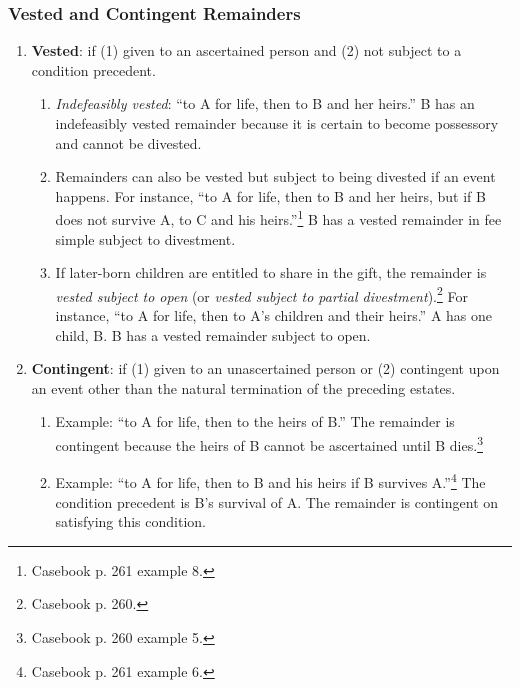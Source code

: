 \subsubsection{Vested and Contingent Remainders}

\begin{enumerate}
    \item \textbf{Vested}: if (1) given to an ascertained person and (2) not 
    subject to a condition precedent.
    \begin{enumerate}
        \item \emph{Indefeasibly vested}:  ``to A for life, then to B and her 
        heirs.'' B has an indefeasibly vested remainder because it is certain 
        to become possessory and cannot be divested.
        \item Remainders can also be vested but subject to being divested if 
        an event happens. For instance, ``to A for life, then to B and her 
        heirs, but if B does not survive A, to C and his 
        heirs.''\footnote{Casebook p. 261 example 8.} B has a vested remainder 
        in fee simple subject to divestment.
        \item If later-born children are entitled to share in the gift, the 
        remainder is \emph{vested subject to open} (or \emph{vested subject to 
        partial divestment}).\footnote{Casebook p. 260.} For instance, ``to A 
        for life, then to A's children and their heirs.'' A has one child, B. 
        B has a vested remainder subject to open.
    \end{enumerate}
    \item \textbf{Contingent}: if (1) given to an unascertained person or (2) 
    contingent upon an event other than the natural termination of the 
    preceding estates.
    \begin{enumerate}
        \item Example: ``to A for life, then to the heirs of B.'' The 
        remainder is contingent because the heirs of B cannot be ascertained 
        until B dies.\footnote{Casebook p. 260 example 5.}
        \item Example: ``to A for life, then to B and his heirs if B survives 
        A.''\footnote{Casebook p. 261 example 6.} The condition precedent is 
        B's survival of A. The remainder is contingent on satisfying this 
        condition.
    \end{enumerate}
\end{enumerate}

